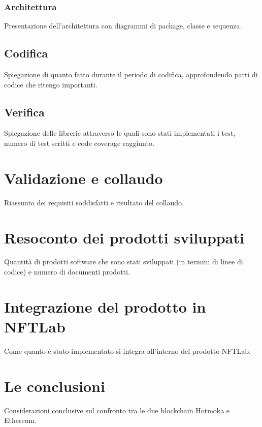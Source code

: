 \subsubsection{Architettura}
Presentazione dell'architettura con diagrammi di package, classe e sequenza.

\subsection{Codifica}
Spiegazione di quanto fatto durante il periodo di codifica, approfondendo parti di codice che ritengo importanti.

\subsection{Verifica}
Spiegazione delle librerie attraverso le quali sono stati implementati i test, numero di test scritti e code coverage raggiunto.


\section{Validazione e collaudo}
Riassunto dei requisiti soddisfatti e risultato del collaudo.


\section{Resoconto dei prodotti sviluppati}
Quantità di prodotti software che sono stati sviluppati (in termini di linee di codice) e numero di documenti prodotti.


\section{Integrazione del prodotto in NFTLab}
Come quanto è stato implementato si integra all'interno del prodotto NFTLab.


\section{Le conclusioni}
Considerazioni conclusive sul confronto tra le due blockchain Hotmoka e Ethereum.
